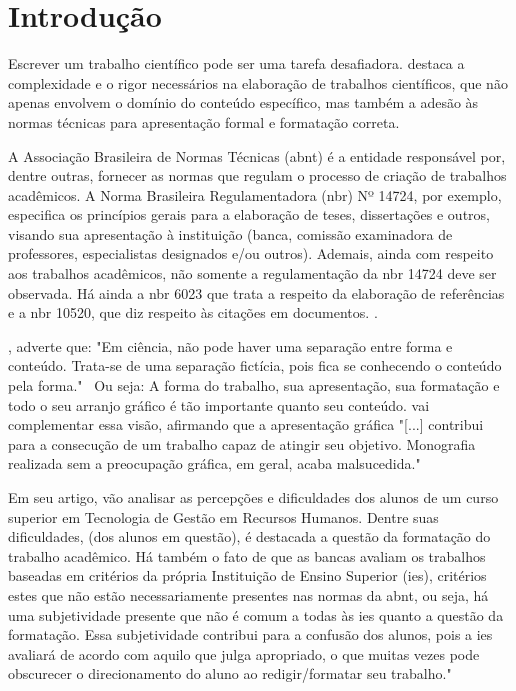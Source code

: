 \chapter{Introdução}

Escrever um trabalho científico pode ser uma tarefa desafiadora. \cite{severino}
destaca a complexidade e o rigor necessários na elaboração de trabalhos científicos, que não
apenas envolvem o domínio do conteúdo específico, mas também a adesão às normas
técnicas para apresentação formal e formatação correta.

A Associação Brasileira de Normas Técnicas 
(\acrshort{abnt})
é a entidade responsável por,
dentre outras, fornecer as normas que regulam o processo de criação de trabalhos acadêmicos.
A Norma Brasileira Regulamentadora 
(\acrshort{nbr})
 Nº 14724, por exemplo, especifica os princípios
gerais para a elaboração de teses, dissertações e outros, visando sua apresentação à
instituição (banca, comissão examinadora de professores, especialistas designados e/ou
outros). Ademais, ainda com respeito aos trabalhos acadêmicos, não somente a
regulamentação da 
\acrshort{nbr}
14724 deve ser observada. Há ainda a 
\acrshort{nbr}
6023 que trata a respeito
da elaboração de referências e a 
\acrshort{nbr}
10520, que diz respeito às citações em documentos.
\cite{abnt}.

\cite{castro}, adverte que: "Em ciência, não pode haver uma
separação entre forma e conteúdo. Trata-se de uma separação fictícia, pois fica se conhecendo
o conteúdo pela forma."~ Ou seja: A forma do trabalho, sua apresentação, sua formatação e
todo o seu arranjo gráfico é tão importante quanto seu conteúdo. 
\cite{medeiros} vai
complementar essa visão, afirmando que a apresentação gráfica "{[}...{]} contribui para a
consecução de um trabalho capaz de atingir seu objetivo. Monografia realizada sem a
preocupação gráfica, em geral, acaba malsucedida."~

Em seu artigo, 
\cite{SilvaVitoria}
vão analisar as percepções e dificuldades dos
alunos de um curso superior em Tecnologia de Gestão em Recursos Humanos. Dentre suas
dificuldades, (dos alunos em questão), é destacada a questão da formatação do trabalho
acadêmico. Há também o fato de que as bancas avaliam os trabalhos baseadas em critérios da
própria Instituição de Ensino Superior
(\acrshort{ies}),
critérios estes que não estão necessariamente
presentes nas normas da \acrshort{abnt}, ou seja, há uma subjetividade presente que não é comum a
todas às \acrshort{ies} quanto a questão da formatação. Essa subjetividade contribui para a confusão dos
alunos, pois a \acrshort{ies} avaliará de acordo com aquilo que julga apropriado, o que muitas vezes
pode obscurecer o direcionamento do aluno ao redigir/formatar seu trabalho."~

